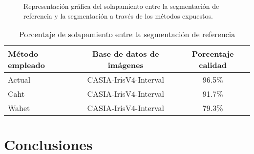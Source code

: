 \begin{figure}[htbp]
\centering
{}
\caption{Representación gráfica del solapamiento entre la segmentación de referencia y la segmentación a través de los métodos expuestos.} \label{fig:señales}
\end{figure}

\begin{table}[h]
\begin{center}
\begin{tabular}{@{}lcc@{}}
\toprule
Método empleado		& Base de datos de imágenes 		& Porcentaje calidad \\ \hline
Actual 			& CASIA-IrisV4-Interval		& 96.5\% \\
Caht 			& CASIA-IrisV4-Interval		& 91.7\% \\
Wahet  		& CASIA-IrisV4-Interval		& 79.3\% \\
\end{tabular}
\end{center}
\caption{Porcentaje de solapamiento entre la segmentación de referencia}
\label{my_tabla}
\end{table}

\begin{table}[htbp]
\begin{center}
\end{center}
\end{table}

\section{Conclusiones}

